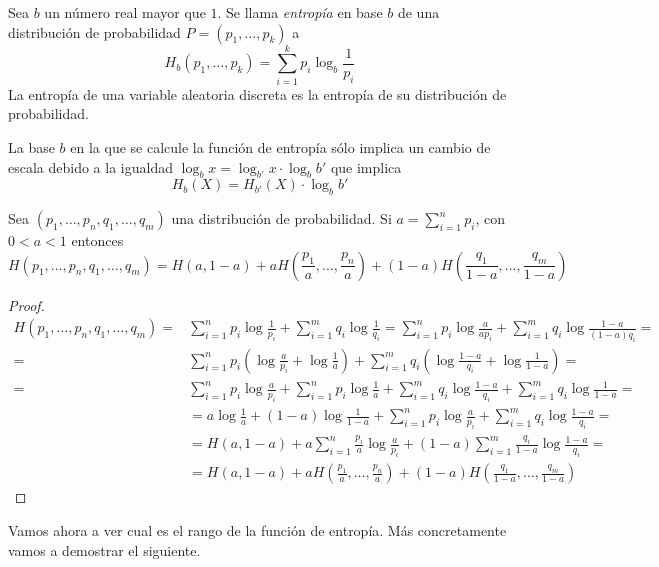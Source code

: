 \begin{df}
    Sea $b$ un número real mayor que $1$. Se llama {\it entropía} en base $b$ de una distribución de probabilidad $P=(p_1,\dots,p_k)$ a
    $$H_b(p_1,\dots,p_k)=\sum_{i=1}^kp_i\log_b\frac{1}{p_i}$$
    La entropía de una variable aleatoria discreta es la entropía de su distribución de probabilidad.
\end{df}

La base $b$ en la que se calcule la función de entropía sólo implica un cambio de escala debido a la igualdad $\log_bx=\log_{b'}x\cdot\log_bb'$ que implica
$$H_b(X)=H_{b'}(X)\cdot\log_bb'$$

\begin{prop}
    Sea $(p_1,\dots,p_n,q_1,\dots,q_m)$ una distribución de probabilidad. Si $a=\sum_{i=1}^{n}p_i$, con $0<a<1$ entonces
    $$H(p_1,\dots,p_n,q_1,\dots,q_m)=H(a, 1-a)+aH\left(\frac{p_1}{a},\dots,\frac{p_n}{a}\right)+(1-a)H\left(\frac{q_1}{1-a},\dots,\frac{q_m}{1-a}\right) $$    
\end{prop}

\begin{proof}
    \begin{equation*}
        \begin{split}
            H(p_1,\dots,p_n,q_1,\dots,q_m)=& \sum_{i=1}^np_i\log\frac{1}{p_i} + \sum_{i=1}^mq_i\log\frac{1}{q_i} = \sum_{i=1}^np_i\log\frac{a}{ap_i} + \sum_{i=1}^mq_i\log\frac{1-a}{(1-a)q_i} = \\
            =&\sum_{i=1}^np_i\left(\log\frac{a}{p_i}+\log\frac{1}{a}\right) + \sum_{i=1}^mq_i\left(\log\frac{1-a}{q_i}+\log\frac{1}{1-a}\right) = \\
            =&\sum_{i=1}^np_i\log\frac{a}{p_i} + \sum_{i=1}^np_i\log\frac{1}{a} + \sum_{i=1}^mq_i\log\frac{1-a}{q_i}+\sum_{i=1}^mq_i\log\frac{1}{1-a}=\\
            &=a\log\frac{1}{a}+(1-a)\log\frac{1}{1-a} + \sum_{i=1}^np_i\log\frac{a}{p_i} + \sum_{i=1}^mq_i\log\frac{1-a}{q_i} = \\
            &=H(a,1-a) + a\sum_{i=1}^n\frac{p_i}{a}\log\frac{a}{p_i} + (1-a)\sum_{i=1}^m\frac{q_i}{1-a}\log\frac{1-a}{q_i} = \\
            &= H(a, 1-a) +aH\left(\frac{p_1}{a},\dots,\frac{p_n}{a}\right) + (1-a)H\left(\frac{q_1}{1-a},\dots,\frac{q_m}{1-a}\right)
        \end{split}
    \end{equation*}
\end{proof}

Vamos ahora a ver cual es el rango de la función de entropía. Más concretamente vamos a demostrar el siguiente.

